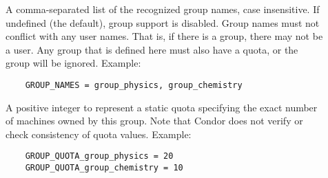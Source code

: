 \begin{description}

\item[] \label{param:GroupNames}
  A comma-separated list of the recognized group names, case insensitive.
  If undefined (the default), group support is disabled.
  Group names must not conflict with any user names.
  That is, if there is a \verb@physics@ group, there may not be
  a \verb@physics@ user.
  Any group that is defined here must also have a quota,
  or the group will be ignored. Example: 
  \begin{verbatim}
    GROUP_NAMES = group_physics, group_chemistry 
  \end{verbatim}

\item[] \label{param:GroupQuotaGroupname}
  A positive integer  to represent a static quota specifying
  the exact number of machines owned by this group.
  Note that Condor does not verify or check consistency of quota values.
  Example:
  \begin{verbatim}
    GROUP_QUOTA_group_physics = 20
    GROUP_QUOTA_group_chemistry = 10
  \end{verbatim}

%



\end{description}
